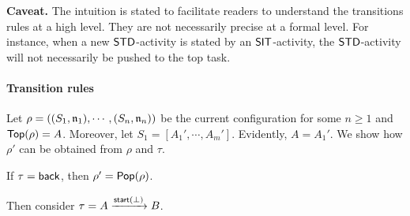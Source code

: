 \noindent\textbf{Caveat.} The intuition is stated to facilitate readers to understand the transitions rules at a high level. They are not necessarily precise at a formal level. For instance, when a new $\mathsf{STD}$-activity is stated by an $\mathsf{SIT}$-activity, the $\mathsf{STD}$-activity will not necessarily be pushed to the top task. 


\smallskip

\paragraph{Transition rules} 


Let $\rho = ((S_1,\mathfrak{n}_1),\cdots,(S_n,\mathfrak{n}_n))$ be the current configuration for some $n \ge 1$ and $\mathsf{Top}(\rho) = A$. Moreover, let $S_1 = [A_1',\cdots,A_m']$. Evidently, $A = A_1'$. We show how $\rho'$ can be obtained from $\rho$ and $\tau$.
	
	If $\tau = {\mathsf{back} }$, then $\rho' = \mathsf{Pop}(\rho)$. 
	
	Then consider $\tau = A\xrightarrow{{\mathsf{start} }(\bot)}B$.
	
	
	
	
	
	

